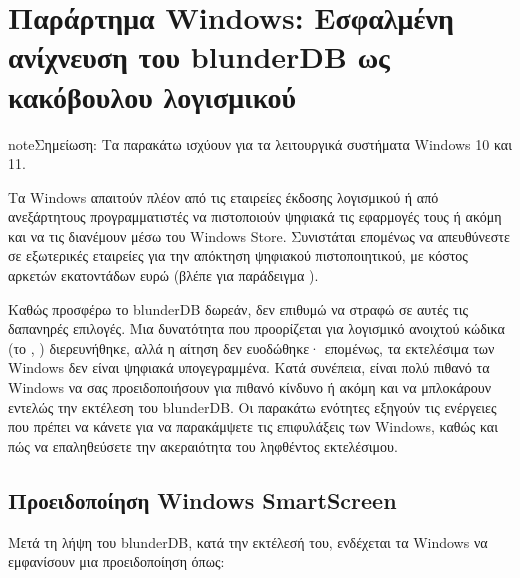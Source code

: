\documentclass[letterpaper,10pt,greek]{sphinxmanual}
\begin{document}
\section{Παράρτημα Windows: Εσφαλμένη ανίχνευση του blunderDB ως κακόβουλου λογισμικού}
\label{\detokenize{annexe_windows_securite:annexe-windows-detection-abusive-de-blunderdb-comme-logiciel-malveillant}}\label{\detokenize{annexe_windows_securite:annexe-windows-malware}}\label{\detokenize{annexe_windows_securite::doc}}
\begin{sphinxadmonition}{note}{Σημείωση:}
\sphinxAtStartPar
Τα παρακάτω ισχύουν για τα λειτουργικά συστήματα Windows 10 και 11.
\end{sphinxadmonition}

\sphinxAtStartPar
Τα Windows απαιτούν πλέον από τις εταιρείες έκδοσης λογισμικού ή από ανεξάρτητους προγραμματιστές να πιστοποιούν ψηφιακά τις εφαρμογές τους ή ακόμη και να τις διανέμουν μέσω του Windows Store. Συνιστάται επομένως να απευθύνεστε σε εξωτερικές εταιρείες για την απόκτηση ψηφιακού πιστοποιητικού, με κόστος αρκετών εκατοντάδων ευρώ (βλέπε για παράδειγμα  ).

\sphinxAtStartPar
Καθώς προσφέρω το blunderDB δωρεάν, δεν επιθυμώ να στραφώ σε αυτές τις δαπανηρές επιλογές. Μια  δυνατότητα που προορίζεται για λογισμικό ανοιχτού κώδικα (το , ) διερευνήθηκε, αλλά η αίτηση δεν ευοδώθηκε· επομένως, τα εκτελέσιμα των Windows δεν είναι ψηφιακά υπογεγραμμένα. Κατά συνέπεια, είναι πολύ πιθανό τα Windows να σας προειδοποιήσουν για πιθανό κίνδυνο ή ακόμη και να μπλοκάρουν εντελώς την εκτέλεση του blunderDB. Οι παρακάτω ενότητες εξηγούν τις ενέργειες που πρέπει να κάνετε για να παρακάμψετε τις επιφυλάξεις των Windows, καθώς και πώς να επαληθεύσετε την ακεραιότητα του ληφθέντος εκτελέσιμου.


\subsection{Προειδοποίηση Windows SmartScreen}
\label{\detokenize{annexe_windows_securite:avertissement-windows-smartscreen}}
\sphinxAtStartPar
Μετά τη λήψη του blunderDB, κατά την εκτέλεσή του, ενδέχεται τα Windows να εμφανίσουν μια προειδοποίηση όπως:

\begin{figure}[htbp]
\centering

\noindent{}
\end{figure}
\end{document}
